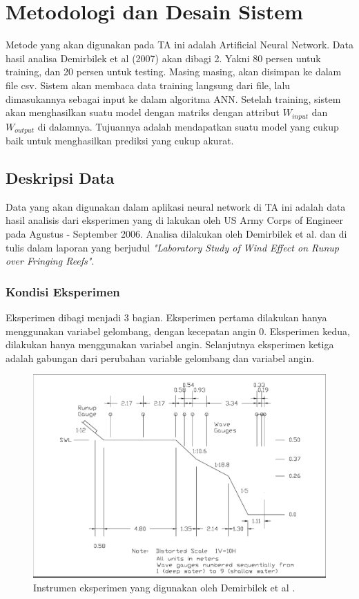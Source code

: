 \chapter{Metodologi dan Desain Sistem}
  Metode yang akan digunakan pada TA ini adalah Artificial Neural Network. Data hasil analisa Demirbilek et al (2007) \cite{DemirbilekReport} akan dibagi 2. Yakni 80 persen untuk training, dan 20 persen untuk testing. Masing masing, akan disimpan ke dalam file csv. Sistem akan membaca data training langsung dari file, lalu dimasukannya sebagai input ke dalam algoritma ANN. Setelah training, sistem akan menghasilkan suatu model dengan matriks dengan attribut $W_{input}$ dan $W_{output}$ di dalamnya. Tujuannya adalah mendapatkan suatu model yang cukup baik untuk menghasilkan prediksi yang cukup akurat.

\section{Deskripsi Data}
Data yang akan digunakan dalam aplikasi neural network di TA ini adalah data hasil analisis dari eksperimen yang di lakukan oleh US Army Corps of Engineer pada Agustus - September 2006. Analisa dilakukan oleh Demirbilek et al. dan di tulis dalam laporan yang berjudul \emph{"Laboratory Study of Wind Effect on Runup over Fringing Reefs"}.

\subsection{Kondisi Eksperimen}
\label{kondisiEksperimen}

Eksperimen dibagi menjadi 3 bagian. Eksperimen pertama dilakukan hanya menggunakan variabel gelombang, dengan kecepatan angin 0. Eksperimen kedua, dilakukan hanya menggunakan variabel angin. Selanjutnya eksperimen ketiga adalah gabungan dari perubahan variable gelombang dan variabel angin.

\begin{figure}
  \begin{center}
    \includegraphics[scale=0.2]{./images/instrumen_eksperimen.png}
  \end{center}
  \caption{Instrumen eksperimen yang digunakan oleh Demirbilek et al \cite{DemirbilekReport}.}
\end{figure}
\FloatBarrier

